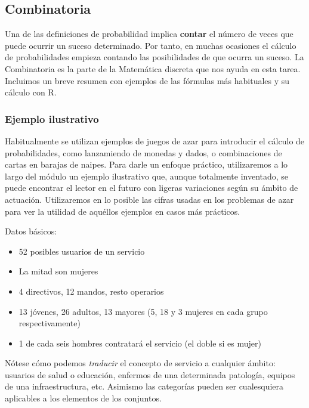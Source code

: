 \documentclass[
]{article}
\begin{document}
\hypertarget{combinatoria}{%
\subsection{Combinatoria}\label{combinatoria}}

Una de las definiciones de probabilidad implica \textbf{contar} el
número de veces que puede ocurrir un suceso determinado. Por tanto, en
muchas ocasiones el cálculo de probabilidades empieza contando las
posibilidades de que ocurra un suceso. La Combinatoria es la parte de la
Matemática discreta que nos ayuda en esta tarea. Incluimos un breve
resumen con ejemplos de las fórmulas más habituales y su cálculo con R.

\hypertarget{ejemplo-ilustrativo}{%
\subsubsection{Ejemplo ilustrativo}\label{ejemplo-ilustrativo}}

Habitualmente se utilizan ejemplos de juegos de azar para introducir el
cálculo de probabilidades, como lanzamiendo de monedas y dados, o
combinaciones de cartas en barajas de naipes. Para darle un enfoque
práctico, utilizaremos a lo largo del módulo un ejemplo ilustrativo que,
aunque totalmente inventado, se puede encontrar el lector en el futuro
con ligeras variaciones según su ámbito de actuación. Utilizaremos en lo
posible las cifras usadas en los problemas de azar para ver la utilidad
de aquéllos ejemplos en casos más prácticos.

Datos básicos:

\begin{itemize}
\item
  52 posibles usuarios de un servicio
\item
  La mitad son mujeres
\item
  4 directivos, 12 mandos, resto operarios
\item
  13 jóvenes, 26 adultos, 13 mayores (5, 18 y 3 mujeres en cada grupo
  respectivamente)
\item
  1 de cada seis hombres contratará el servicio (el doble si es mujer)
\end{itemize}

Nótese cómo podemos \emph{traducir} el concepto de servicio a cualquier
ámbito: usuarios de salud o educación, enfermos de una determinada
patología, equipos de una infraestructura, etc. Asimismo las categorías
pueden ser cualesquiera aplicables a los elementos de los conjuntos.
\end{document}
